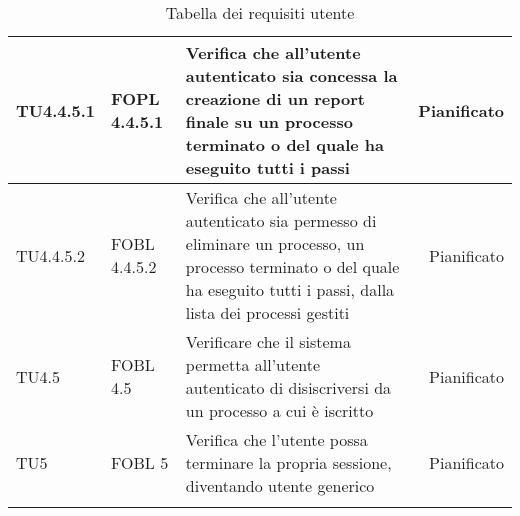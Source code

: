 \begin{longtable}{llXr}
\midrule
TU4.4.5.1&FOPL 4.4.5.1&Verifica che all'utente autenticato sia concessa la creazione di un report finale su un processo terminato o del quale ha eseguito tutti i passi&Pianificato\\
\midrule
TU4.4.5.2&FOBL 4.4.5.2&Verifica che all'utente autenticato sia permesso di eliminare un processo, un processo terminato o del quale ha eseguito tutti i passi, dalla lista dei processi gestiti&Pianificato\\
\midrule
TU4.5&FOBL 4.5&Verificare che il sistema permetta all'utente autenticato di disiscriversi da un processo a cui è iscritto&Pianificato\\
\midrule
TU5&FOBL 5&Verifica che l'utente possa terminare la propria sessione, diventando utente generico&Pianificato\\
\bottomrule
\caption{Tabella dei requisiti utente}
\end{longtable}